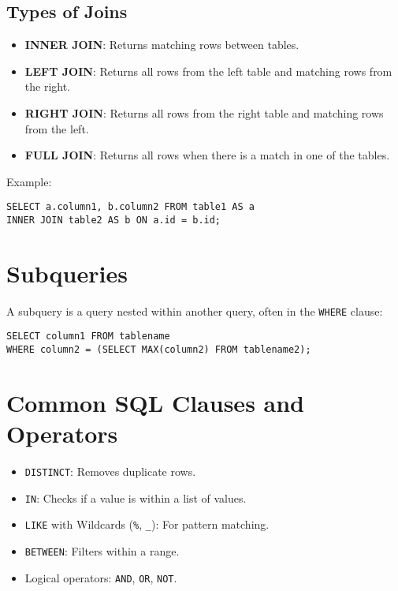 \documentclass{article}
\begin{document}
\subsection{Types of Joins}
\begin{itemize}
    \item \textbf{INNER JOIN}: Returns matching rows between tables.
    \item \textbf{LEFT JOIN}: Returns all rows from the left table and matching rows from the right.
    \item \textbf{RIGHT JOIN}: Returns all rows from the right table and matching rows from the left.
    \item \textbf{FULL JOIN}: Returns all rows when there is a match in one of the tables.
\end{itemize}
Example:
\begin{verbatim}
SELECT a.column1, b.column2 FROM table1 AS a
INNER JOIN table2 AS b ON a.id = b.id;
\end{verbatim}

\section{Subqueries}
A subquery is a query nested within another query, often in the \texttt{WHERE} clause:
\begin{verbatim}
SELECT column1 FROM tablename
WHERE column2 = (SELECT MAX(column2) FROM tablename2);
\end{verbatim}

\section{Common SQL Clauses and Operators}
\begin{itemize}
    \item \texttt{DISTINCT}: Removes duplicate rows.
    \item \texttt{IN}: Checks if a value is within a list of values.
    \item \texttt{LIKE} with Wildcards (\texttt{\%}, \texttt{\_}): For pattern matching.
    \item \texttt{BETWEEN}: Filters within a range.
    \item Logical operators: \texttt{AND}, \texttt{OR}, \texttt{NOT}.
\end{itemize}
\end{document}

